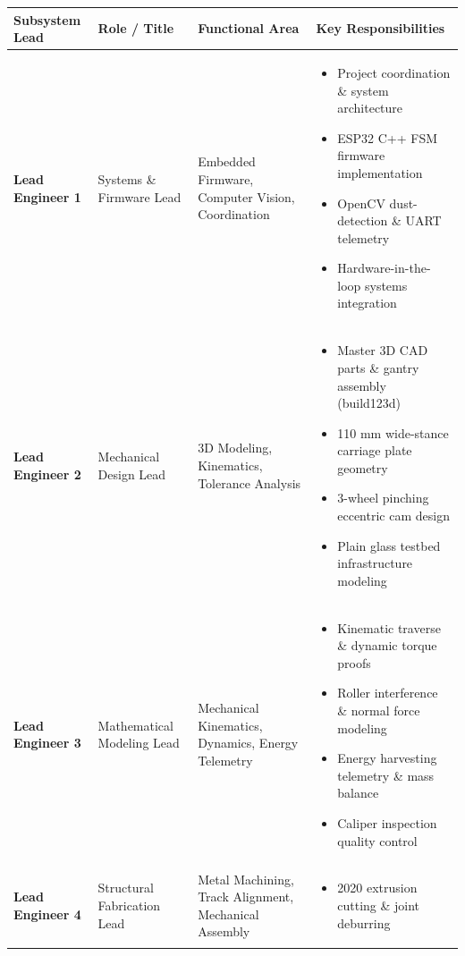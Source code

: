 \documentclass[10pt,a4paper]{article}
\begin{document}
\begin{table}[H]
\centering
\small
\begin{tabularx}{\textwidth}{p{3.5cm} p{3.5cm} p{4.2cm} X}
\toprule
\textbf{Subsystem Lead} & \textbf{Role / Title} & \textbf{Functional Area} & \textbf{Key Responsibilities} \\
\midrule
\textbf{Lead Engineer 1} & Systems \& Firmware Lead & Embedded Firmware, Computer Vision, Coordination & 
\begin{itemize}[leftmargin=*, nosep]
    \item Project coordination \& system architecture
    \item ESP32 C++ FSM firmware implementation
    \item OpenCV dust-detection \& UART telemetry
    \item Hardware-in-the-loop systems integration
\end{itemize} \\
\addlinespace[0.4em]
\textbf{Lead Engineer 2} & Mechanical Design Lead & 3D Modeling, Kinematics, Tolerance Analysis & 
\begin{itemize}[leftmargin=*, nosep]
    \item Master 3D CAD parts \& gantry assembly (build123d)
    \item 110 mm wide-stance carriage plate geometry
    \item 3-wheel pinching eccentric cam design
    \item Plain glass testbed infrastructure modeling
\end{itemize} \\
\addlinespace[0.4em]
\textbf{Lead Engineer 3} & Mathematical Modeling Lead & Mechanical Kinematics, Dynamics, Energy Telemetry & 
\begin{itemize}[leftmargin=*, nosep]
    \item Kinematic traverse \& dynamic torque proofs
    \item Roller interference \& normal force modeling
    \item Energy harvesting telemetry \& mass balance
    \item Caliper inspection quality control
\end{itemize} \\
\addlinespace[0.4em]
\textbf{Lead Engineer 4} & Structural Fabrication Lead & Metal Machining, Track Alignment, Mechanical Assembly & 
\begin{itemize}[leftmargin=*, nosep]
    \item 2020 extrusion cutting \& joint deburring

\end{itemize}
\end{tabularx}
\end{table}
\end{document}
